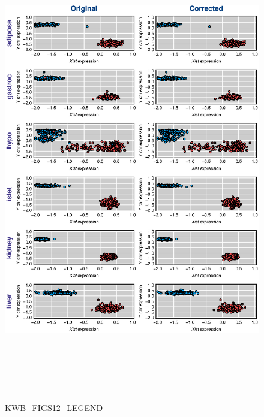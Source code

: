 \documentclass[letterpaper,twoside]{article}
\begin{document}
\begin{figure}[p]
\centerline{\includegraphics[height=8.0in]{SuppFigs/figS12.eps}}

\caption{KWB_FIGS12_LEGEND}
\end{figure}



\clearpage
\end{document}
